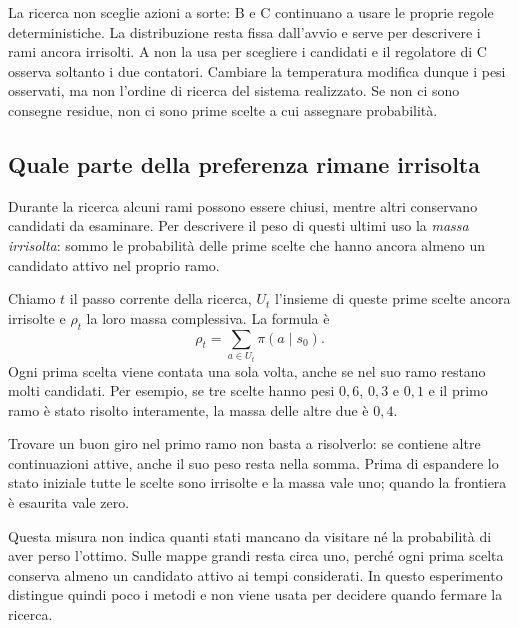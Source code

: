 La ricerca non sceglie azioni a sorte: B e C continuano a usare le proprie
regole deterministiche. La distribuzione resta fissa dall'avvio e serve
per descrivere i rami ancora irrisolti. A non la usa per scegliere i
candidati e il regolatore di C osserva soltanto i due contatori.
Cambiare la temperatura modifica dunque i pesi osservati, ma non l'ordine
di ricerca del sistema realizzato. Se non ci sono consegne residue,
non ci sono prime scelte a cui assegnare probabilità.

\subsection{Quale parte della preferenza rimane irrisolta}
Durante la ricerca alcuni rami possono essere chiusi, mentre altri
conservano candidati da esaminare. Per descrivere il peso di questi ultimi
uso la \emph{massa irrisolta}: sommo le probabilità delle prime scelte
che hanno ancora almeno un candidato attivo nel proprio ramo.

Chiamo $t$ il passo corrente della ricerca, $U_t$ l'insieme di queste prime
scelte ancora irrisolte e $\rho_t$ la loro massa complessiva. La formula è
\[
 \rho_t=\sum_{a\in U_t}\pi(a\mid s_0).
\]
Ogni prima scelta viene contata una sola volta, anche se nel suo ramo
restano molti candidati. Per esempio, se tre scelte hanno pesi
$0{,}6$, $0{,}3$ e $0{,}1$ e il primo ramo è stato risolto interamente,
la massa delle altre due è $0{,}4$.

Trovare un buon giro nel primo ramo non basta a risolverlo: se contiene
altre continuazioni attive, anche il suo peso resta nella somma.
Prima di espandere lo stato iniziale tutte le scelte sono irrisolte e
la massa vale uno; quando la frontiera è esaurita vale zero.

Questa misura non indica quanti stati mancano da visitare né la probabilità
di aver perso l'ottimo. Sulle mappe grandi resta circa uno, perché ogni
prima scelta conserva almeno un candidato attivo ai tempi considerati.
In questo esperimento distingue quindi poco i metodi e non viene usata
per decidere quando fermare la ricerca.
